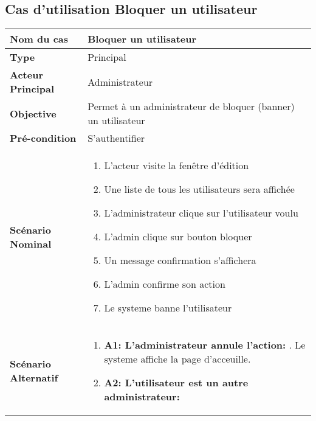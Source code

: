 \subsection{Cas d'utilisation Bloquer un utilisateur}
\renewcommand{\arraystretch}{2}
\begin{center}
	\begin{table}[H]
		\centering
		\tiny{\begin{tabular}{ | l | m{0.51\textheight}|}
				\hline
				\rowcolor[HTML]{06a8ed}
				\textbf{Nom du cas} & Bloquer un utilisateur \\
				\hline\hline
				\cellcolor[HTML]{99ccff} \textbf{Type} & Principal \\
				\hline
				\cellcolor[HTML]{99ccff} \textbf{Acteur Principal} & Administrateur\\
				\hline
				\cellcolor[HTML]{99ccff} \textbf{Objective} & Permet à un administrateur de bloquer (banner) un utilisateur\\
				\hline
				\cellcolor[HTML]{99ccff} \textbf{Pré-condition} & S'authentifier\\
				\hline
				\cellcolor[HTML]{99ccff} \textbf{Scénario Nominal} & \parbox{0.43\textheight}{
					\begin{enumerate}
						\vspace{0.01\textheight}
						    \item L’acteur visite la fenêtre d’édition
							\item Une liste de tous les utilisateurs sera affichée
							\item L’administrateur clique sur l’utilisateur voulu
							\item L’admin clique sur bouton bloquer
							\item Un message confirmation s’affichera
							\item L’admin confirme son action
							\item Le systeme banne l'utilisateur
						\vspace{0.01\textheight}
				\end{enumerate}}\\
				\hline
				 \textbf{Scénario Alternatif} & \parbox{0.43\textheight}{
					\begin{enumerate}
						\item \textbf{A1: L'administrateur annule l'action:}
						. Le systeme affiche la page d'acceuille.\newline						
						\item \textbf{A2: L'utilisateur est un autre administrateur:}

\end{enumerate}}
\end{tabular}}
\end{table}
\end{center}
